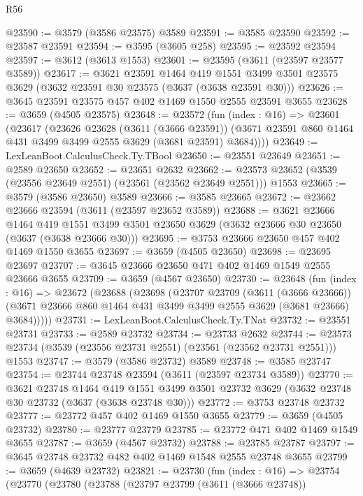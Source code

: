 \begin{lexlean}{R56}
\begin{coremodule}
@23590 := @3579 (@3586 @23575) @3589
@23591 := @3585 @23590
@23592 := @23587 @23591
@23594 := @3595 (@3605 @258)
@23595 := @23592 @23594
@23597 := @3612 (@3613 @1553)
@23601 := @23595 (@3611 (@23597 @23577 @3589))
@23617 := @3621
    @23591
    @1464
    @419
    @1551
    @3499
    @3501
    @23575
    @3629
    (@3632 @23591 @30 @23575 (@3637 (@3638 @23591 @30)))
@23626 := @3645 @23591 @23575 @457 @402 @1469 @1550 @2555 @23591 @3655
@23628 := @3659 (@4505 @23575)
@23648 := @23572
    (fun (index : @16) =>
    @23601
      (@23617
        (@23626
          @23628
          (@3611 (@3666 @23591))
          (@3671 @23591 @860 @1464 @431 @3499 @3499 @2555 @3629 (@3681 @23591) @3684))))
@23649 := LexLeanBoot.CalculusCheck.Ty.TBool
@23650 := @23551 @23649
@23651 := @2589 @23650
@23652 := @23651 @2632
@23662 := @23573 @23652 (@3539 (@23556 @23649 @2551) (@23561 (@23562 @23649 @2551))) @1553
@23665 := @3579 (@3586 @23650) @3589
@23666 := @3585 @23665
@23672 := @23662 @23666 @23594 (@3611 (@23597 @23652 @3589))
@23688 := @3621
    @23666
    @1464
    @419
    @1551
    @3499
    @3501
    @23650
    @3629
    (@3632 @23666 @30 @23650 (@3637 (@3638 @23666 @30)))
@23695 := @3753 @23666 @23650 @457 @402 @1469 @1550 @3655
@23697 := @3659 (@4505 @23650)
@23698 := @23695 @23697
@23707 := @3645 @23666 @23650 @471 @402 @1469 @1549 @2555 @23666 @3655
@23709 := @3659 (@4567 @23650)
@23730 := @23648
    (fun (index : @16) =>
    @23672
      (@23688
        (@23698
          (@23707
            @23709
            (@3611 (@3666 @23666))
            (@3671 @23666 @860 @1464 @431 @3499 @3499 @2555 @3629 (@3681 @23666) @3684)))))
@23731 := LexLeanBoot.CalculusCheck.Ty.TNat
@23732 := @23551 @23731
@23733 := @2589 @23732
@23734 := @23733 @2632
@23744 := @23573 @23734 (@3539 (@23556 @23731 @2551) (@23561 (@23562 @23731 @2551))) @1553
@23747 := @3579 (@3586 @23732) @3589
@23748 := @3585 @23747
@23754 := @23744 @23748 @23594 (@3611 (@23597 @23734 @3589))
@23770 := @3621
    @23748
    @1464
    @419
    @1551
    @3499
    @3501
    @23732
    @3629
    (@3632 @23748 @30 @23732 (@3637 (@3638 @23748 @30)))
@23772 := @3753 @23748 @23732
@23777 := @23772 @457 @402 @1469 @1550 @3655
@23779 := @3659 (@4505 @23732)
@23780 := @23777 @23779
@23785 := @23772 @471 @402 @1469 @1549 @3655
@23787 := @3659 (@4567 @23732)
@23788 := @23785 @23787
@23797 := @3645 @23748 @23732 @482 @402 @1469 @1548 @2555 @23748 @3655
@23799 := @3659 (@4639 @23732)
@23821 := @23730
    (fun (index : @16) =>
    @23754
      (@23770
        (@23780
          (@23788
            (@23797
              @23799
              (@3611 (@3666 @23748))

\end{coremodule}
\end{lexlean}
